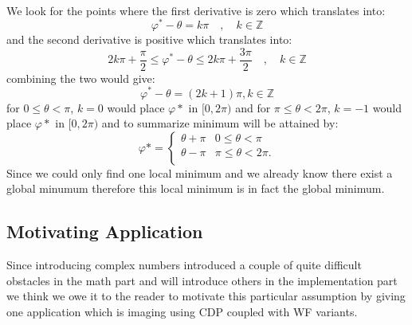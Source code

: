 \begin{Proof}
\begin{equation}
\begin{split}
				\end{split}
			  \end{equation}
        We look for the points where the first derivative is zero which translates into:
        \begin{equation}
          \varphi^* - \theta = k\pi \quad , \quad k \in \mathbb{Z} 
        \end{equation}
        and the second derivative is positive which translates into:
        \begin{equation}
         2k\pi + \frac{\pi}{2} \leq \varphi^* - \theta \leq 2k\pi + \frac{3\pi}{2} \quad , \quad k \in \mathbb{Z}
        \end{equation}
        combining the two would give:
        \begin{equation}
          \varphi^* -\theta = (2k+1)\pi, k \in \mathbb{Z}
        \end{equation}
        for $0   \leq \theta <  \pi$, $k=0$ would place $\varphi*$ in $[0,2\pi)$ and for  $\pi \leq \theta < 2\pi$, 
        $k=-1$ would place $\varphi*$ in $[0,2\pi)$ and to summarize minimum will be attained by:
        \begin{equation}
          \varphi* =
          \begin{cases}
            \theta + \pi & 0   \leq \theta <  \pi\\
            \theta - \pi & \pi \leq \theta < 2\pi.\\
          \end{cases}
        \end{equation}
        Since we could only find one local minimum and we already know there exist a global minumum therefore this local minimum is in fact the global minimum.
		\end{Proof}


  




\subsection{Motivating Application}\label{sec:motivating_application}

Since introducing complex numbers introduced a couple of quite difficult obstacles in the math part and will introduce others in the implementation part 
we think we owe it to the reader to motivate this particular assumption by giving one application which is imaging using \ac{CDP} coupled with \ac{WF} variants.

